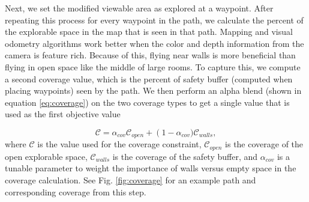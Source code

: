 \documentclass[letterpaper, 10 pt, conference]{ieeeconf}  %
\begin{document}
 Next, we set the modified viewable area as explored at a waypoint. After repeating this process for every waypoint in the path, we calculate the percent of the explorable space in the map that is seen in that path. Mapping and visual odometry algorithms work better when the color and depth information from the camera is feature rich. Because of this, flying near walls is more beneficial than flying in open space like the middle of large rooms. To capture this, we compute a second coverage value, which is the percent of safety buffer (computed when placing waypoints) seen by the path. We then perform an alpha blend (shown in equation \ref{eq:coverage}) on the two coverage types to get a single value that is used as the first objective value

\begin{equation}\label{eq:coverage}%
    \mathcal{C} = \alpha_{\mathit{cov}} \mathcal{C}_{\mathit{open}} + \left(1-\alpha_{\mathit{cov}})\right. \mathcal{C}_{\mathit{walls}},
\end{equation}
%
where $\mathcal{C}$ is the value used for the coverage constraint, $\mathcal{C}_{\mathit{open}}$ is the coverage of the open explorable space, $\mathcal{C}_{\mathit{walls}}$ is the coverage of the safety buffer, and $\alpha_{\mathit{cov}}$ is a tunable parameter to weight the importance of walls versus empty space in the coverage calculation. See Fig. \ref{fig:coverage} for an example path and corresponding coverage from this step.
\end{document}
